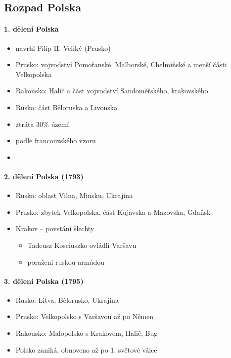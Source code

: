 \subsection{Rozpad Polska}
\paragraph{1. dělení Polska}
\begin{itemize}
\item navrhl Filip II. Veliký (Prusko)
\item Prusko: vojvodství Pomořanské, Malborské, Chelmiňské a menší části Velkopolska
\item Rakousko: Halič a část vojvodství Sandoměřského, krakovského
\item Rusko: část Běloruska a Livonska
\item ztráta 30\% území
\item {} podle francouzského vzoru
\item {}
\end{itemize}

\paragraph{2. dělení Polska (1793)}
\begin{itemize}
\item Rusko: oblast Vilna, Minsku, Ukrajina
\item Prusko: zbytek Velkopolska, část Kujavska a Mazovska, Gdaňsk
\item Krakov -- povstání šlechty 
	\begin{itemize}
	\item Tadeusz Kosciuszko ovládli Varšavu
	\item poraženi ruskou armádou
	\end{itemize}
\end{itemize}

\paragraph{3. dělení Polska (1795)}
\begin{itemize}
\item Rusko: Litva, Bělorusko, Ukrajina
\item Prusko: Velkopolsko s Varšavou až po Němen
\item Rakousko: Malopolsko s Krakovem, Halič, Bug
\item Polsko zaniká, obnoveno až po 1. světové válce 
\end{itemize}



